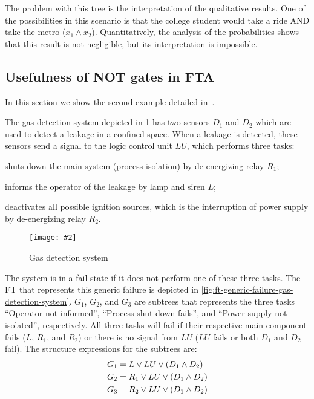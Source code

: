 \documentclass[12pt,openright,twoside,a4paper,oldfontcommands,english,brazil,final]{abntex2}
\theoremstyle{theo}
\newcommand{\includegraphicsaspectratio}[2][1]{%
  \texttt{[image: \#2]}%
}
\newcommand{\parsin}[1]{\ensuremath\left( #1 \right)}
\begin{document}
The problem with this tree is the interpretation of the qualitative results.
One of the possibilities in this scenario is that the college student would take a ride \ac{AND} take the metro ($x_1 \land x_2$).
Quantitatively, the analysis of the probabilities shows that this result is not negligible, but its interpretation is impossible.

\subsection[Usefulness of NOT gates in FTA]{Usefulness of \ac{NOT} gates in \ac{FTA}}
\label{sec:non-coherent-usefulness}

In this section we show the second example detailed in~\cite{Andrews2001}.

The gas detection system depicted in \cref{fig:gas-detection-system} has two sensors $D_1$ and $D_2$ which are used to detect a leakage in a confined space.
When a leakage is detected, these sensors send a signal to the logic control unit $LU$, which performs three tasks:
%
\begin{alineas}
  \item shuts-down the main system (process isolation) by de-energizing relay $R_1$;
  \item informs the operator of the leakage by lamp and siren $L$;
  \item deactivates all possible ignition sources, which is the interruption of power supply by de-energizing relay $R_2$.
\end{alineas}

\begin{figure}[htb]
  \centering
  \includegraphicsaspectratio[0.45]{gas-detection-system}
  \caption{Gas detection system}
  \label{fig:gas-detection-system}
\end{figure}

The system is in a fail state if it does not perform one of these three tasks.
The \acl{FT} that represents this generic failure is depicted in \cref{fig:ft-generic-failure-gas-detection-system}.
$G_1$, $G_2$, and $G_3$ are subtrees that represents the three tasks ``Operator not informed'', ``Process shut-down fails'', and ``Power supply not isolated'', respectively.
All three tasks will fail if their respective main component fails ($L$, $R_1$, and $R_2$) or there is no signal from $LU$ ($LU$ fails or both $D_1$ and $D_2$ fail).
The structure expressions for the subtrees are:
%
\begin{align*}
  G_1 & = L \lor LU \lor \parsin{D_1 \land D_2}\\
  G_2 & = R_1 \lor LU \lor \parsin{D_1 \land D_2}\\
  G_3 & = R_2 \lor LU \lor \parsin{D_1 \land D_2}
\end{align*}
\end{document}

